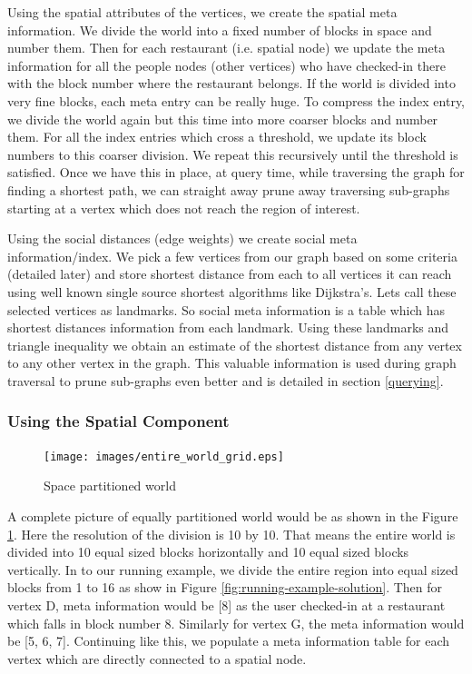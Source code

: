 Using the spatial attributes of the vertices, we create the spatial meta information. We divide the world into a fixed number of blocks in space and number them. Then for each restaurant (i.e. spatial node) we update the meta information for all the people nodes (other vertices) who have checked-in there with the block number where the restaurant belongs. If the world is divided into very fine blocks, each meta entry can be really huge. To compress the index entry, we divide the world again but this time into more coarser blocks and number them. For all the index entries which cross a threshold, we update its block numbers to this coarser division. We repeat this recursively until the threshold is satisfied. Once we have this in place, at query time, while traversing the graph for finding a shortest path, we can straight away prune away traversing sub-graphs starting at a vertex which does not reach the region of interest.

Using the social distances (edge weights) we create social meta information/index. We pick a few vertices from our graph based on some criteria (detailed later) and store shortest distance from each to all vertices it can reach using well known single source shortest algorithms like Dijkstra's. Lets call these selected vertices as landmarks. So social meta information is a table which has shortest distances information from each landmark. Using these landmarks and triangle inequality we obtain an estimate of the shortest distance from any vertex to any other vertex in the graph. This valuable information is used during graph traversal to prune sub-graphs even better and is detailed in section \ref{querying}.

\subsubsection{Using the Spatial Component}

\begin{figure}[t]
	\centering \texttt{[image: images/entire\_world\_grid.eps]}
    \caption{Space partitioned world}
    \label{fig:space-partitioned}
\end{figure}

A complete picture of equally partitioned world would be as shown in the Figure \ref{fig:space-partitioned}. Here the resolution of the division is 10 by 10. That means the entire world is divided into 10 equal sized blocks horizontally and 10 equal sized blocks vertically. In to our running example, we divide the entire region into equal sized blocks from 1 to 16 as show in Figure \ref{fig:running-example-solution}. Then for vertex D, meta information would be {[}8{]} as the user checked-in at a restaurant which falls in block number 8. Similarly for vertex G, the meta information would be {[}5, 6, 7{]}. Continuing like this, we populate a meta information table for each vertex which are directly connected to a spatial node.

